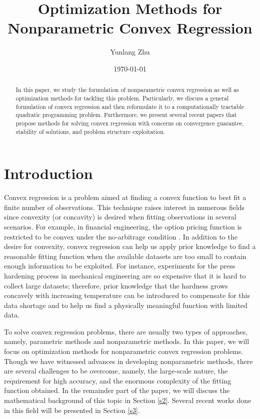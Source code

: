 \documentclass{article}
\title{Optimization Methods for Nonparametric Convex Regression}
\author{Yunlang Zhu}
\date{\today}
\begin{document}
\maketitle

\begin{abstract}
    In this paper, we study the formulation of nonparametric convex regression as well as optimization methods for tackling this problem. Particularly, we discuss a general formulation of convex regression and then reformulate it to a computationally tractable quadratic programming problem. Furthermore, we present several recent papers that propose methods for solving convex regression with concerns on convergence guarantee, stability of solutions, and problem structure exploitation. 
\end{abstract}

\section{Introduction}
Convex regression is a problem aimed at finding a convex function to best fit a finite number of observations. This technique raises interest in numerous fields since convexity (or concavity) is desired when fitting observations in several scenarios. For example, in financial engineering, the option pricing function is restricted to be convex under the no-arbitrage condition \cite{Sahalia03}. In addition to the desire for convexity, convex regression can help us apply prior knowledge to find a reasonable fitting function when the available datasets are too small to contain enough information to be exploited. For instance, experiments for the press hardening process in mechanical engineering are so expensive that it is hard to collect large datasets; therefore, prior knowledge that the hardness grows concavely with increasing temperature \cite{Kurnatowski_2021} can be introduced to compensate for this data shortage and to help us find a physically meaningful function with limited data. 

To solve convex regression problems, there are usually two types of approaches, namely, parametric methods and nonparametric methods. In this paper, we will focus on optimization methods for nonparametric convex regression problems. Though we have witnessed advances in developing nonparametric methods, there are several challenges to be overcome, namely, the large-scale nature, the requirement for high accuracy, and the enormous complexity of the fitting function obtained. In the remainder part of the paper, we will discuss the mathematical background of this topic in Section \ref{s2}. Several recent works done in this field will be presented in Section \ref{s3}.
\end{document}
